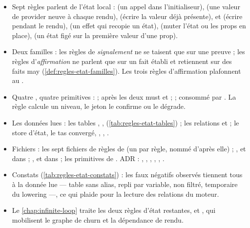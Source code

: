 \begin{resume}
\begin{itemize}
  \item Sept règles parlent de l'état local :  (un appel dans l'initialiseur),  (une valeur de provider neuve à chaque rendu),  (écrire la valeur déjà présente),  et  (écrire pendant le rendu),  (un effet qui recopie un état),  (muter l'état ou les props en place),  (un état figé sur la première valeur d'une prop).
  \item Deux familles : les règles de \emph{signalement} ne se taisent que sur une preuve ; les règles d'\emph{affirmation} ne parlent que sur un fait établi et retiennent sur des faits may (\cref{def:regles-etat-familles}). Les trois règles d'affirmation plafonnent au \Warning.
  \item Quatre \Error{}, quatre primitives :  ;  après les deux must  et  ;  ;  consommé par . La règle calcule un niveau, le jeton le confirme ou le dégrade.
  \item Les données lues : les tables , ,  (\cref{tab:regles-etat-tables}) ; les relations  et  ; le store d'état, le tas convergé, , , .
  \item Fichiers : les sept fichiers de règles de  (un par règle, nommé d'après elle) ; ,  et  dans  ; ,  et  dans  ; les primitives de . ADR : , , , , , .
  \item Constats (\cref{tab:regles-etat-constats}) : les faux négatifs observés tiennent tous à la donnée lue --- table sans alias, repli par variable,  non filtré, temporaire du lowering ---, ce qui plaide pour la lecture des relations du moteur.
  \item Le \cref{chap:infinite-loop} traite les deux règles d'état restantes,  et , qui mobilisent le graphe de churn et la dépendance de rendu.
\end{itemize}
\end{resume}

